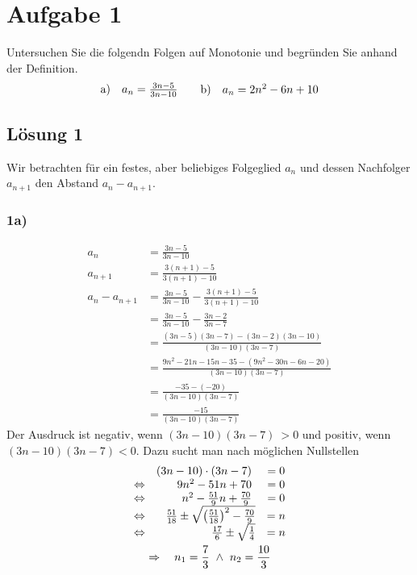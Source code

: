 \section*{Aufgabe 1}

Untersuchen Sie die folgendn Folgen auf Monotonie und begründen Sie anhand der Definition.
\begin{align*}
  \begin{array}{ c c }
    \text{a)} & a_{n} =\frac{3n-5}{3n-10}
  \end{array} & & \begin{array}{ c c }
    \text{b)} & a_{n} =2n^{2} -6n+10
  \end{array}
\end{align*}


\subsection*{Lösung 1}
Wir betrachten für ein festes, aber beliebiges Folgeglied $\displaystyle a_{n}$ und dessen Nachfolger $\displaystyle a_{n+1}$ den Abstand $\displaystyle a_{n} -a_{n+1}$.

\subsubsection*{1a)}

\begin{align*}
  a_{n} & =\frac{3n-5}{3n-10}\\
  a_{n+1} & =\frac{3( n+1) -5}{3( n+1) -10}\\
  a_{n} -a_{n+1} & =\frac{3n-5}{3n-10} -\frac{3( n+1) -5}{3( n+1) -10}\\
  & =\frac{3n-5}{3n-10} -\frac{3n-2}{3n-7}\\
  & =\frac{( 3n-5)( 3n-7) -( 3n-2)( 3n-10)}{( 3n-10)( 3n-7)}\\
  & =\frac{9n^{2} -21n-15n-35-\left( 9n^{2} -30n-6n-20\right)}{( 3n-10)( 3n-7)}\\
  & =\frac{-35-( -20)}{( 3n-10)( 3n-7)}\\
  & =\frac{-15}{( 3n-10)( 3n-7)}
\end{align*}
Der Ausdruck ist negativ, wenn $\displaystyle ( 3n-10)( 3n-7) \  >0$ und positiv, wenn $\displaystyle ( 3n-10)( 3n-7) < 0$. Dazu sucht man nach möglichen Nullstellen
\begin{gather*}
  \begin{array}{ c r c }
    & ( 3n-10) \cdot ( 3n-7) \  & =0\\
    \Leftrightarrow  & 9n^{2} -51n+70\  & =0\\
    \Leftrightarrow  & n^{2} -\frac{51}{9} n+\frac{70}{9} \  & =0\\
    \Leftrightarrow  & \frac{51}{18} \pm \sqrt{\left(\frac{51}{18}\right)^{2} -\frac{70}{9}} & =n\\
    \Leftrightarrow  & \frac{17}{6} \pm \sqrt{\frac{1}{4}} & =n
  \end{array}\\
  \Rightarrow \ \ \ n_{1} =\frac{7}{3} \ \land \ n_{2} =\frac{10}{3}
\end{gather*}


